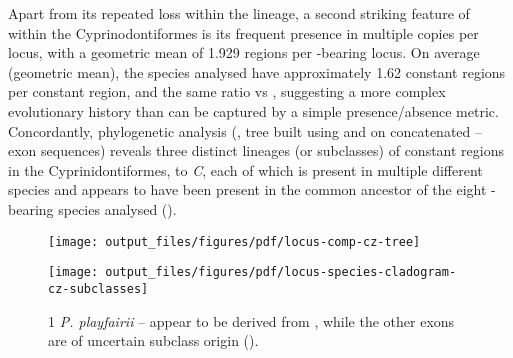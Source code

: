 Apart from its repeated loss within the lineage, a second striking feature of  within the Cyprinodontiformes is its frequent presence in multiple copies per \igh{} locus, with a geometric mean of 1.929 regions per -bearing locus. On average (geometric mean), the species analysed have approximately 1.62  constant regions per  constant region, and the same ratio vs , suggesting a more complex evolutionary history than can be captured by a simple presence/absence metric. Concordantly, phylogenetic analysis (, tree built using  and  on concatenated -- exon sequences) reveals three distinct lineages (or subclasses) of  constant regions in the Cyprinidontiformes,  to \textit{C}, each of which is present in multiple different species and appears to have been present in the common ancestor of the eight -bearing species analysed ().

\begin{figure}
	\centering
	\texttt{[image: output\_files/figures/pdf/locus-comp-cz-tree]}
	\label{fig:multispecies-cz-tree}
\end{figure}

\begin{figure}
\centering
\texttt{[image: output\_files/figures/pdf/locus-species-cladogram-cz-subclasses]}
\begin{minipage}{0.7\textwidth}
\footnotesize
\begin{threeparttable}
\begin{tablenotes}
\item[1] \textit{P. playfairii}  -- appear to be derived from , while the other exons are of uncertain subclass origin ().
\end{tablenotes}
\end{threeparttable}
\end{minipage}
\label{fig:multispecies-cz-subclasses}
\end{figure}


